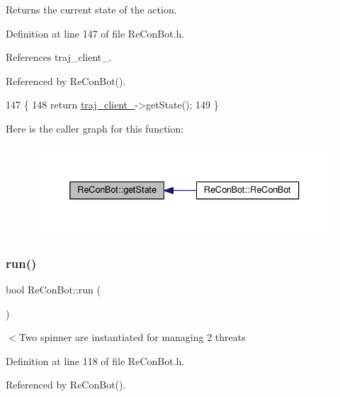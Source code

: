 Returns the current state of the action. 



Definition at line 147 of file Re\+Con\+Bot.\+h.



References traj\+\_\+client\+\_\+.



Referenced by Re\+Con\+Bot().


\begin{DoxyCode}
147                                                  \{
148   \textcolor{keywordflow}{return} \hyperlink{class_re_con_bot_a14a35ad6ca284af7db7228d7872720d1}{traj\_client\_}->getState();
149 \}
\end{DoxyCode}
Here is the caller graph for this function\+:
\nopagebreak
\begin{figure}[H]
\begin{center}
\leavevmode
\includegraphics[width=336pt]{d9/d0b/class_re_con_bot_a3d9656755c06ded1f3b88ce05565f758_icgraph}
\end{center}
\end{figure}
\mbox{\label{class_re_con_bot_ac264f3082203c3b2ef13b6f353476ca7}} 
\subsubsection{\texorpdfstring{run()}{run()}}
{\footnotesize\ttfamily bool Re\+Con\+Bot\+::run (\begin{DoxyParamCaption}{ }\end{DoxyParamCaption})}

$<$Two spinner are instantiated for managing 2 threats 

Definition at line 118 of file Re\+Con\+Bot.\+h.



Referenced by Re\+Con\+Bot().


